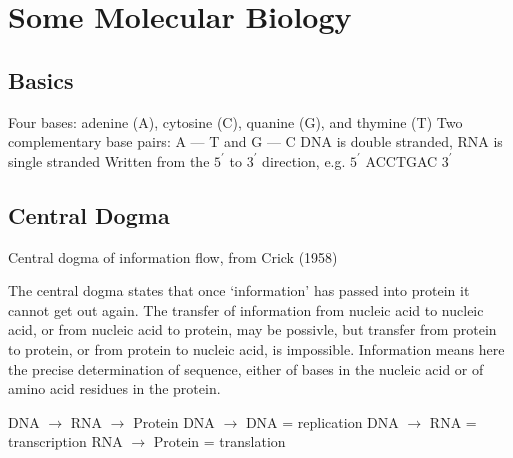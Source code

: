 \documentclass[../waterman_intro_comp_bio.tex]{subfiles}
\begin{document}
\section{Some Molecular Biology}
    \subsection{Basics}
        \begin{outline}
            \1 Four bases: adenine (A), cytosine (C), quanine (G), and thymine (T)
            \1 Two complementary base pairs: A --- T and G --- C
            \1 DNA is double stranded, RNA is single stranded
                \2 Written from the \(5^{\prime}\) to \(3^{\prime}\) direction, e.g. \(5^{\prime}\) ACCTGAC \(3^{\prime}\)
        \end{outline}

    \subsection{Central Dogma}
        \begin{outline}
            \1 Central dogma of information flow, from Crick (1958)
            
            \begin{displayquote}
                The central dogma states that once `information' has passed into protein it cannot get out again. The transfer of information from nucleic acid to nucleic acid, or from nucleic acid to protein, may be possivle, but transfer from protein to protein, or from protein to nucleic acid, is impossible. Information means here the precise determination of sequence, either of bases in the nucleic acid or of amino acid residues in the protein.
            \end{displayquote}

            \1 DNA \(\rightarrow\) RNA \(\rightarrow\) Protein
                \2 DNA \(\rightarrow\) DNA = replication
                \2 DNA \(\rightarrow\) RNA = transcription
                \2 RNA \(\rightarrow\) Protein = translation
        \end{outline}
\end{document}
